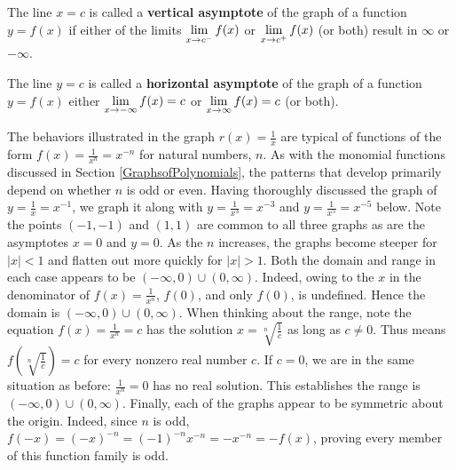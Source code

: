 \colorbox{ResultColor}{\bbm

\begin{defn} \label{va} The line $x=c$ is called a \textbf{vertical asymptote} of the graph of a function $y=f(x)$  if either of the limits $\ds{ \lim_{x \rightarrow c^{-}} f(x)}$ or  $\ds{ \lim_{x \rightarrow c^{+}} f(x)}$ (or both) result in $\infty$ or $-\infty$.

\end{defn}
\ebm}

\medskip


\colorbox{ResultColor}{\bbm

\begin{defn} \label{ha} The line $y=c$ is called a \textbf{horizontal asymptote} of the graph of a function $y=f(x)$ either  $\ds{ \lim_{x \rightarrow -\infty} f(x)=c}$ or  $\ds{ \lim_{x \rightarrow \infty} f(x)=c}$ (or both).
\end{defn}
\ebm}

\medskip


The behaviors illustrated in the graph $r(x) = \frac{1}{x}$ are typical of functions of the form $f(x) = \frac{1}{x^n} = x^{-n}$ for natural numbers, $n$.  As with the monomial functions discussed in Section \ref{GraphsofPolynomials}, the patterns that develop primarily depend on whether $n$ is odd or even.  Having thoroughly discussed the graph of $y = \frac{1}{x} = x^{-1}$, we graph it along with $y = \frac{1}{x^3} = x^{-3}$ and $y = \frac{1}{x^5} = x^{-5}$ below.  Note the points $(-1,-1)$ and $(1,1)$ are common to all three graphs as are the asymptotes $x = 0$ and $y = 0$.  As the $n$ increases, the graphs become steeper for $|x| < 1$  and flatten out more quickly for $|x|>1$.  Both the domain and range in each case appears to be $(-\infty, 0) \cup (0, \infty)$.  Indeed, owing to the $x$ in the denominator of $f(x) = \frac{1}{x^n}$, $f(0)$, and only $f(0)$,  is undefined. Hence the domain is $(-\infty, 0) \cup (0, \infty)$.  When thinking about the range, note the equation  $f(x)= \frac{1}{x^n}  = c$ has the solution $x = \sqrt[n]{\frac{1}{c}}$ as long as $c \neq 0$.  Thus means $f\left( \sqrt[n]{\frac{1}{c}} \right) = c$ for every nonzero real number $c$.  If $c = 0$, we are in the same situation as before:  $\frac{1}{x^n} = 0$ has no real solution.  This establishes the range is $(-\infty, 0) \cup (0, \infty)$.  Finally, each of the graphs appear to be symmetric about the origin.  Indeed, since $n$ is odd, $f(-x) = (-x)^{-n} = (-1)^{-n} x^{-n} = -x^{-n} = -f(x)$, proving every member of this function family is odd.  

